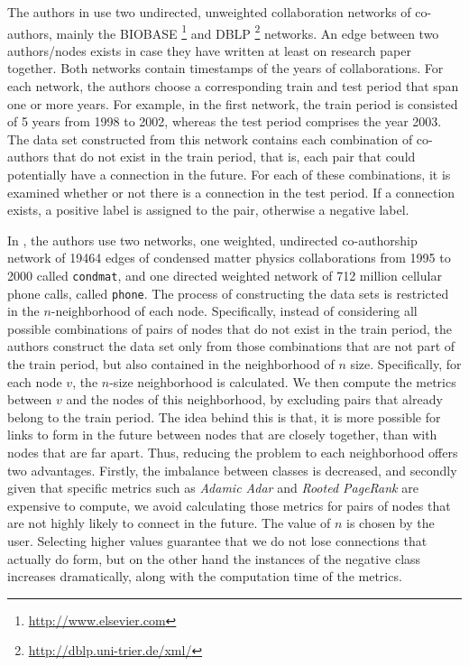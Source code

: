\documentclass{acm_proc_article-sp}
\begin{document}
The authors in \cite{Hasan06linkprediction} use two undirected, unweighted collaboration networks of co-authors, mainly the BIOBASE \footnote{\url{http://www.elsevier.com}} and DBLP \footnote{\url{http://dblp.uni-trier.de/xml/}} networks. An edge between two authors/nodes exists in case they have written at least on research paper together. Both networks contain timestamps of the years of collaborations. For each network, the authors choose a corresponding train and test period that span one or more years. For example, in the first network, the train period is consisted of 5 years from 1998 to 2002, whereas the test period comprises the year 2003. The data set constructed from this network contains each combination of co-authors that do not exist in the train period, that is, each pair that could potentially have a connection in the future. For each of these combinations, it is examined whether or not there is a connection in the test period. If a connection exists, a positive label is assigned to the pair, otherwise a negative label. 

In \cite{Lichtenwalter:2010:NPM:1835804.1835837}, the authors use two networks, one weighted, undirected co-authorship network of 19464 edges of condensed matter physics collaborations from 1995 to 2000 called \texttt{condmat}, and one directed weighted network of 712 million cellular phone calls, called \texttt{phone}. The process of constructing the data sets is restricted in the $n$-neighborhood of each node. Specifically, instead of considering all possible combinations of pairs of nodes that do not exist in the train period, the authors construct the data set only from those combinations that are not part of the train period, but also contained in the neighborhood of $n$ size. Specifically, for each node $v$, the $n$-size neighborhood is calculated. We then compute the metrics between $v$ and the nodes of this neighborhood, by excluding pairs that already belong to the train period. The idea behind this is that, it is more possible for links to form in the future between nodes that are closely together, than with nodes that are far apart. Thus, reducing the problem to each neighborhood offers two advantages. Firstly, the imbalance between classes is decreased, and secondly given that specific metrics such as \textit{Adamic Adar} and \textit{Rooted PageRank} are expensive to compute, we avoid calculating those metrics for pairs of nodes that are not highly likely to connect in the future. The value of $n$ is chosen by the user. Selecting higher values guarantee that we do not lose connections that actually do form, but on the other hand the instances of the negative class increases dramatically, along with the computation time of the metrics.
\end{document}
